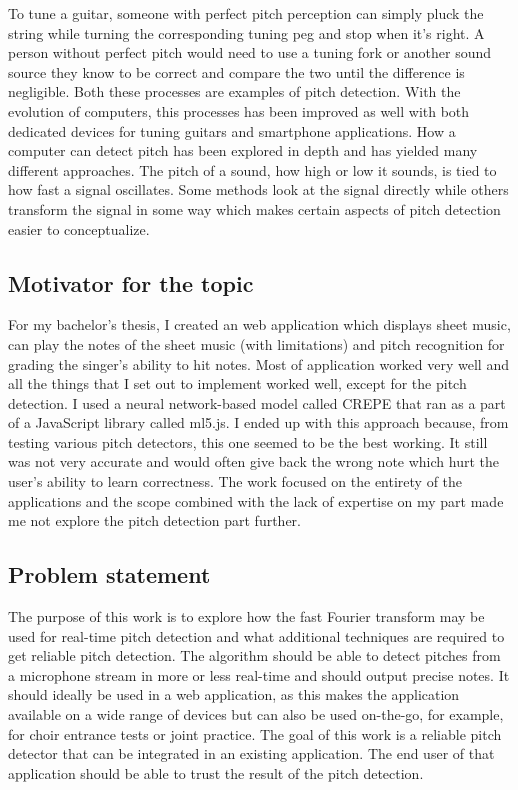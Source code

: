 To tune a guitar, someone with perfect pitch perception can simply pluck the string while turning the corresponding tuning peg and stop when it's right. A person without perfect pitch would need to use a tuning fork or another sound source they know to be correct and compare the two until the difference is negligible. Both these processes are examples of pitch detection. With the evolution of computers, this processes has been improved as well with both dedicated devices for tuning guitars and smartphone applications. How a computer can detect pitch has been explored in depth and has yielded many different approaches. The pitch of a sound, how high or low it sounds, is tied to how fast a signal oscillates. Some methods look at the signal directly while others transform the signal in some way which makes certain aspects of pitch detection easier to conceptualize.

\subsection{Motivator for the topic}
For my bachelor's thesis, I created an web application which displays sheet music, can play the notes of the sheet music (with limitations) and pitch recognition for grading the singer's ability to hit notes. Most of application worked very well and all the things that I set out to implement worked well, except for the pitch detection. I used a neural network-based model called CREPE that ran as a part of a JavaScript library called ml5.js. I ended up with this approach because, from testing various pitch detectors, this one seemed to be the best working. It still was not very accurate and would often give back the wrong note which hurt the user's ability to learn correctness. The work focused on the entirety of the applications and the scope combined with the lack of expertise on my part made me not explore the pitch detection part further.  

\subsection{Problem statement}
The purpose of this work is to explore how the fast Fourier transform may be used for real-time pitch detection and what additional techniques are required to get reliable pitch detection. The algorithm should be able to detect pitches from a microphone stream in more or less real-time and should output precise notes. It should ideally be used in a web application, as this makes the application available on a wide range of devices but can also be used on-the-go, for example, for choir entrance tests or joint practice. The goal of this work is a reliable pitch detector that can be integrated in an existing application. The end user of that application should be able to trust the result of the pitch detection. 
